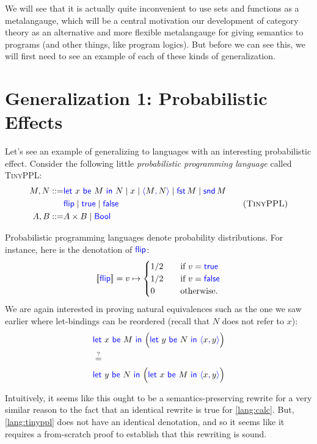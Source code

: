 We will see that it is actually quite inconvenient to use sets and functions as a metalangauge, 
which will be a central motivation our development of category theory as an alternative 
and more flexible metalangauge for giving semantics to programs (and other things, like 
program logics).
But before we can see this,
we will first need to see an example of each of these kinds of generalization.

\section{Generalization 1: Probabilistic Effects}
Let's see an example of generalizing to languages with an interesting probabilistic 
effect. Consider the following little \emph{probabilistic programming language} called
\textsc{TinyPPL}:
\begin{gather}
  \begin{aligned}
  M,N ::=& \pllet{x}{M}{N} \mid x \mid \plpair{M}{N} \mid \plfst{M} \mid \plsnd{M} \\
   & \plflip{} \mid \pltrue{} \mid \plfalse{}  \\
  A,B ::=& A \times B \mid \plBool
  \end{aligned}
  \tag{\textsc{TinyPPL}}
  \label{lang:tinyppl}
\end{gather}

Probabilistic programming languages denote probability distributions. For instance,
here is the denotation of $\mathsf{{\color{blue}flip}}{}$:
\begin{align*}
  \left\llbracket \mathsf{{\color{blue}flip}}{} \right\rrbracket = v \mapsto 
  \begin{cases}
    1/2 \quad& \text{if }v=\mathsf{{\color{blue}true}}\\
    1/2 \quad& \text{if }v=\mathsf{{\color{blue}false}}\\
    0 \quad& \text{otherwise.}
  \end{cases}
\end{align*}
We are again interested in proving natural equivalences such as the one 
we saw earlier where let-bindings can be reordered (recall that 
$N$ does not refer to $x$):
\begin{align*}
  &\pllet{x}{M}{\Big( \pllet{y}{N}{\plpair{x}{y}} \Big)}\\
  &\stackrel{?}{=}\\
  &\pllet{y}{N}{\Big( \pllet{x}{M}{\plpair{x}{y}} \Big)}
\end{align*}

Intuitively, it seems like this ought to be a semantics-preserving rewrite for a
very similar reason to the fact that an identical rewrite is true for
\ref{lang:calc}. But, \ref{lang:tinyppl} does not have an identical denotation,
and so it seems like it requires a from-scratch proof to establish that 
this rewriting is sound.


